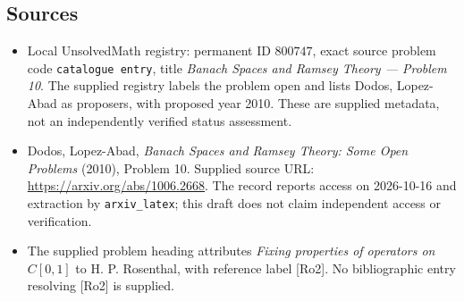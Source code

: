 \documentclass[11pt]{article}
\begin{document}
\subsection{Sources}
\begin{itemize}
\item Local UnsolvedMath registry: permanent ID \(800747\), exact source problem code \texttt{catalogue entry}, title \emph{Banach Spaces and Ramsey Theory --- Problem 10}. The supplied registry labels the problem open and lists Dodos, Lopez-Abad as proposers, with proposed year 2010. These are supplied metadata, not an independently verified status assessment.
\item Dodos, Lopez-Abad, \emph{Banach Spaces and Ramsey Theory: Some Open Problems} (2010), Problem 10. Supplied source URL: \url{https://arxiv.org/abs/1006.2668}. The record reports access on 2026-10-16 and extraction by \texttt{arxiv\_latex}; this draft does not claim independent access or verification.
\item The supplied problem heading attributes \emph{Fixing properties of operators on \(C[0,1]\)} to H. P. Rosenthal, with reference label [Ro2]. No bibliographic entry resolving [Ro2] is supplied.
\end{itemize}
\end{document}
